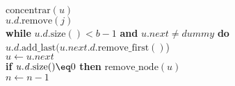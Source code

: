 \documentclass{beamer}
\begin{document}
\begin{frame}[shrink]
\begin{oframed}
\begin{flushleft}
\hspace*{1em} \hspace*{1em} \hspace*{1em} \ensuremath{\mathrm{concentrar}(\ensuremath{\mathit{u}})}\\
\hspace*{1em} \hspace*{1em} \ensuremath{\ensuremath{\mathit{u}}.\ensuremath{\mathit{d}}.\mathrm{remove}(\ensuremath{\mathit{j}})}\\
\hspace*{1em} \hspace*{1em} {\color{black} \textbf{while}} \ensuremath{\ensuremath{\mathit{u}}.\ensuremath{\mathit{d}}.\mathrm{size}() < \ensuremath{\mathit{b}}-1} {\color{black} \textbf{and}} \ensuremath{\ensuremath{\mathit{u}}.\ensuremath{\mathit{next}} \ne dummy} {\color{black} \textbf{do}} \\
\hspace*{1em} \hspace*{1em} \hspace*{1em} \ensuremath{\ensuremath{\mathit{u}}.\ensuremath{\mathit{d}}.\mathrm{add\_last}(\ensuremath{\mathit{u}}.\ensuremath{\mathit{next}}.\ensuremath{\mathit{d}}.\mathrm{remove\_first}()})\\
\hspace*{1em} \hspace*{1em} \hspace*{1em} \ensuremath{\ensuremath{\mathit{u}} \gets  \ensuremath{\ensuremath{\mathit{u}}.next}}\\
\hspace*{1em} \hspace*{1em} {\color{black} \textbf{if}} \ensuremath{\ensuremath{\mathit{u}}.\ensuremath{\mathit{d}}.\mathrm{size}() \eq 0} {\color{black} \textbf{then}}  \ensuremath{\mathrm{remove\_node}(\ensuremath{\mathit{u}})}\\
\hspace*{1em} \hspace*{1em} \ensuremath{\ensuremath{\mathit{n}} \gets  \ensuremath{\ensuremath{\mathit{n}} - 1}}\\
\end{flushleft}
\end{oframed}
\end{frame}
\end{document}
